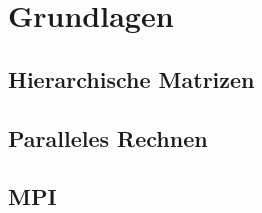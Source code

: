 \chapter{Grundlagen}
  \label{chp:foundations}
  \section{Hierarchische Matrizen}
  \label{sec:h2}
  
  \clearpage
  
  \section{Paralleles Rechnen}
  \label{sec:parrech}
  
  \clearpage
  
  \section{MPI}
  \label{sec:mpi}
  